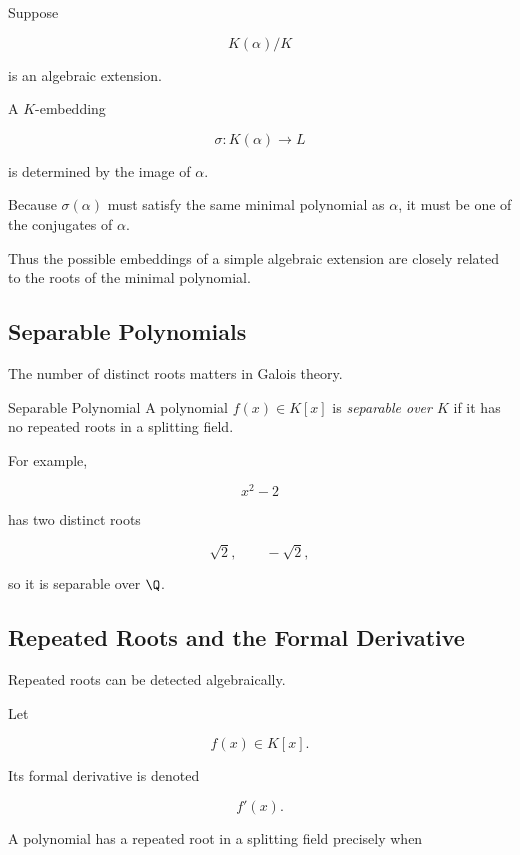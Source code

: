 Suppose

\[ K(\alpha)/K \]

is an algebraic extension.

A \(K\)-embedding

\[ \sigma:K(\alpha)\to L \]

is determined by the image of \(\alpha\).

Because \(\sigma(\alpha)\) must satisfy the same minimal polynomial as
\(\alpha\), it must be one of the conjugates of \(\alpha\).

Thus the possible embeddings of a simple algebraic extension are closely
related to the roots of the minimal polynomial.

\subsection{Separable Polynomials}
\label{subsec:separable-polynomials}

The number of distinct roots matters in Galois theory.

\begin{definitionbox}{Separable Polynomial}
A polynomial \(f(x)\in K[x]\) is \emph{separable over \(K\)} if it has no
repeated roots in a splitting field.
\end{definitionbox}

For example,

\[ x^2-2 \]

has two distinct roots

\[ \sqrt2,\qquad-\sqrt2, \]

so it is separable over \(\Q\).

\subsection{Repeated Roots and the Formal Derivative}
\label{subsec:repeated-roots-derivative}

Repeated roots can be detected algebraically.

Let

\[ f(x)\in K[x]. \]

Its formal derivative is denoted

\[ f'(x). \]

A polynomial has a repeated root in a splitting field precisely when

